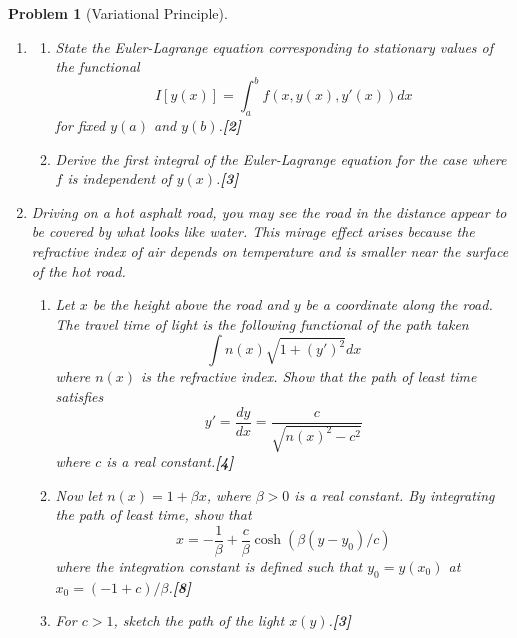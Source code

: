 \documentclass[a4paper]{article}
\theoremstyle{new}
\newtheorem{qns}{Problem}[section]
\begin{document}
\newpage
\begin{qns}[Variational Principle]\leavevmode
\begin{enumerate}[label=(\roman*)]
\item 
\begin{enumerate}[label=(\alph*)]
\item State the Euler-Lagrange equation corresponding to stationary values of the functional
$$I[y(x)]=\int_a^bf(x,y(x),y'(x))dx$$
for fixed $y(a)$ and $y(b)$.\hfill \textbf{[2]}
\item Derive the first integral of the Euler-Lagrange equation for the case where $f$ is independent of $y(x)$.\hfill \textbf{[3]}
\end{enumerate}
\item Driving on a hot asphalt road, you may see the road in the distance appear to be covered by what looks like water. This mirage effect arises because the refractive index of air depends on temperature and is smaller near the surface of the hot road.
\begin{enumerate}[label=(\alph*)]
\item Let $x$ be the height above the road and $y$ be a coordinate along the road. The travel time of light is the following functional of the path taken
$$\int n(x)\sqrt{1+(y')^2}dx$$
where $n(x)$ is the refractive index. Show that the path of least time satisfies
$$y'=\frac{dy}{dx}=\frac{c}{\sqrt{n(x)^2-c^2}}$$
where $c$ is a real constant.\hfill \textbf{[4]}
\item Now let $n(x) = 1 +\beta x$, where $\beta> 0$ is a real constant. By integrating the path of least time, show that 
$$x=-\frac{1}{\beta}+\frac{c}{\beta}\cosh(\beta(y-y_0)/c)$$
where the integration constant is defined such that $y_0=y(x_0)$ at $x_0=(-1+c)/\beta$.\hfill \textbf{[8]}
\item For $c>1$, sketch the path of the light $x(y)$.\hfill \textbf{[3]}
\end{enumerate}
\end{enumerate}
\end{qns}
\end{document}
